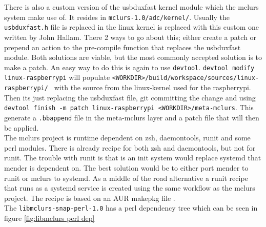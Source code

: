 \documentclass[../../main.tex]{subfiles}
\begin{document}
There is also a custom version of the usbduxfast kernel module which the mclurs system
make use of. It resides in \texttt{mclurs-1.0/adc/kernel/}. Usually the
\texttt{usbduxfast.h} file is replaced in the linux kernel is replaced with this custom
one written by John Hallam.
There 2 ways to go about this; either create a patch or prepend an action to the pre-compile
function that replaces the usbduxfast module.
Both solutions are viable, but the most commonly accepted solution is to make a patch.
An easy way to do this is again to use \texttt{devtool}.
\texttt{devtool modify linux-raspberrypi} will populate
\texttt{<WORKDIR>/build/workspace/sources/linux-raspberrypi/ }
with the source from the linux-kernel used for the raspberrypi.
Then its just replacing the usbduxfast file, git committing the change and
using \texttt{devtool finish -m patch linux-raspberrypi <WORKDIR>/meta-mclurs}.
This generate a \texttt{.bbappend} file in the meta-mclurs layer and a patch file
that will then be applied.\\

The mclurs project is runtime dependent on zsh, daemontools, runit and some perl modules.
There is already recipe for both zsh and daemontools, but not for runit.
The trouble with runit is that is an init system would replace systemd that mender is dependent on.
The best solution would be to either port mender to runit or mclurs to systemd.
As a middle of the road alternative a runit recipe that runs as a systemd service is created using
the same workflow as the mclurs project. The recipe is based on an AUR makepkg file
\cite{runit-systemd-aur}.\\

The \texttt{libmclurs-snap-perl-1.0} has a perl dependency tree which can be seen in
figure \ref{fig:libmclurs perl dep}
\end{document}

